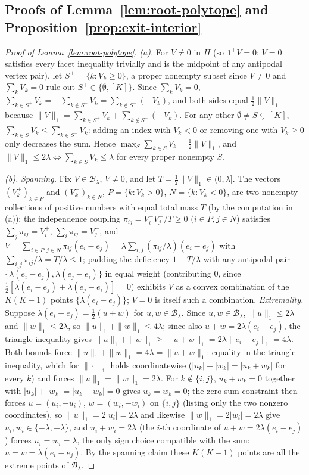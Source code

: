 \documentclass[11pt]{article}
\theoremstyle{plain}
\theoremstyle{definition}
\theoremstyle{remark}
\newcommand{\cB}{\mathcal{B}}
\begin{document}
\subsection{Proofs of Lemma~\ref{lem:root-polytope} and
Proposition~\ref{prop:exit-interior}}\label{app:proof-exit-interior}

\begin{proof}[Proof of Lemma~\ref{lem:root-polytope}]
\emph{(a).} For $V\ne0$ in $H$ (so $\mathbf1^\top V=0$; $V=0$ satisfies every facet
inequality trivially and is the midpoint of any antipodal vertex pair), let
$S^+=\{k:V_k\ge0\}$, a proper nonempty subset since $V\ne0$ and $\sum_kV_k=0$ rule
out $S^+\in\{\emptyset,[K]\}$. Since $\sum_kV_k=0$, $\sum_{k\in
S^+}V_k=-\sum_{k\notin S^+}V_k=\sum_{k\notin S^+}(-V_k)$, and both sides equal
$\frac12\|V\|_1$ because $\|V\|_1=\sum_{k\in S^+}V_k+\sum_{k\notin S^+}(-V_k)$. For
any other $\emptyset\ne S\subsetneq[K]$, $\sum_{k\in S}V_k\le\sum_{k\in S^+}V_k$:
adding an index with $V_k<0$ or removing one with $V_k\ge0$ only decreases the sum.
Hence $\max_S\sum_{k\in S}V_k=\frac12\|V\|_1$, and $\|V\|_1\le2\lambda\iff\sum_{k\in
S}V_k\le\lambda$ for every proper nonempty $S$.

\emph{(b).} \emph{Spanning.} Fix $V\in\cB_\lambda$, $V\ne0$, and let
$T=\frac12\|V\|_1\in(0,\lambda]$. The vectors $(V_k^+)_{k\in P}$ and
$(V_k^-)_{k\in N}$, $P=\{k:V_k>0\}$, $N=\{k:V_k<0\}$, are two nonempty collections
of positive numbers with equal total mass $T$ (by the computation in (a)); the
independence coupling $\pi_{ij}=V_i^+V_j^-/T\ge0$ ($i\in P,j\in N$) satisfies
$\sum_j\pi_{ij}=V_i^+$, $\sum_i\pi_{ij}=V_j^-$, and
$V=\sum_{i\in P,j\in N}\pi_{ij}(e_i-e_j)=\lambda\sum_{i,j}(\pi_{ij}/\lambda)(e_i-e_j)$
with $\sum_{i,j}\pi_{ij}/\lambda=T/\lambda\le1$; padding the deficiency
$1-T/\lambda$ with any antipodal pair $\{\lambda(e_i-e_j),\lambda(e_j-e_i)\}$ in
equal weight (contributing $0$, since $\frac12[\lambda(e_i-e_j)+\lambda(e_j-e_i)]=0$)
exhibits $V$ as a convex combination of the $K(K-1)$ points
$\{\lambda(e_i-e_j)\}$; $V=0$ is itself such a combination. \emph{Extremality.}
Suppose $\lambda(e_i-e_j)=\frac12(u+w)$ for $u,w\in\cB_\lambda$. Since
$u,w\in\cB_\lambda$, $\|u\|_1\le2\lambda$ and $\|w\|_1\le2\lambda$, so
$\|u\|_1+\|w\|_1\le4\lambda$; since also $u+w=2\lambda(e_i-e_j)$, the triangle
inequality gives $\|u\|_1+\|w\|_1\ge\|u+w\|_1=2\lambda\|e_i-e_j\|_1=4\lambda$. Both
bounds force $\|u\|_1+\|w\|_1=4\lambda=\|u+w\|_1$: equality in the triangle
inequality, which for $\|\cdot\|_1$ holds coordinatewise
($|u_k|+|w_k|=|u_k+w_k|$ for every $k$) and forces $\|u\|_1=\|w\|_1=2\lambda$. For
$k\notin\{i,j\}$, $u_k+w_k=0$ together with $|u_k|+|w_k|=|u_k+w_k|=0$ gives
$u_k=w_k=0$; the zero-sum constraint then forces $u=(u_i,-u_i)$, $w=(w_i,-w_i)$ on
$\{i,j\}$ (listing only the two nonzero coordinates), so $\|u\|_1=2|u_i|=2\lambda$
and likewise $\|w\|_1=2|w_i|=2\lambda$ give $u_i,w_i\in\{-\lambda,+\lambda\}$, and
$u_i+w_i=2\lambda$ (the $i$-th coordinate of $u+w=2\lambda(e_i-e_j)$) forces
$u_i=w_i=\lambda$, the only sign choice compatible with the sum: $u=w=\lambda(e_i-e_j)$.
By the spanning claim these $K(K-1)$ points are all the extreme points of
$\cB_\lambda$.


\end{proof}
\end{document}
